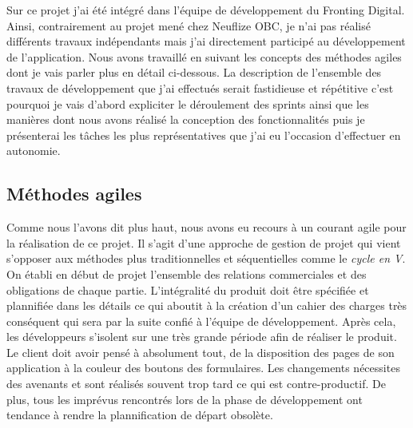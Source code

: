 	Sur ce projet j'ai été intégré dans l'équipe de développement du Fronting Digital. Ainsi, contrairement au projet mené chez Neuflize OBC, je n'ai pas réalisé différents travaux indépendants mais j'ai directement participé au développement de l'application. Nous avons travaillé en suivant les concepts des méthodes agiles \cite{bib_agile} dont je vais parler plus en détail ci-dessous. La description de l'ensemble des travaux de développement que j'ai effectués serait fastidieuse et répétitive c'est pourquoi je vais d'abord expliciter le déroulement des sprints ainsi que les manières dont nous avons réalisé la conception des fonctionnalités puis je présenterai les tâches les plus représentatives que j'ai eu l'occasion d'effectuer en autonomie.

\subsection{Méthodes agiles}
	Comme nous l'avons dit plus haut, nous avons eu recours à un courant agile \cite{bib_agile2} pour la réalisation de ce projet. Il s'agit d'une approche de gestion de projet qui vient s'opposer aux méthodes plus traditionnelles et séquentielles comme le \textit{cycle en V}. On établi en début de projet l'ensemble des relations commerciales et des obligations de chaque partie. L'intégralité du produit doit être spécifiée et plannifiée dans les détails ce qui aboutit à la création d'un cahier des charges très conséquent qui sera par la suite confié à l'équipe de développement. Après cela, les développeurs s'isolent sur une très grande période afin de réaliser le produit. Le client doit avoir pensé à absolument tout, de la disposition des pages de son application à la couleur des boutons des formulaires. Les changements nécessites des avenants et sont réalisés souvent trop tard ce qui est contre-productif. De plus, tous les imprévus rencontrés lors de la phase de développement ont tendance à rendre la plannification de départ obsolète. \\
	
